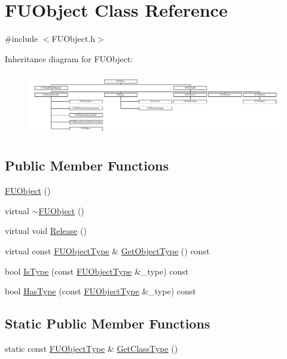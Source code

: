 \hypertarget{classFUObject}{
\section{FUObject Class Reference}
\label{classFUObject}
}


{\ttfamily \#include $<$FUObject.h$>$}

Inheritance diagram for FUObject:\begin{figure}[H]
\begin{center}
\leavevmode
\includegraphics[height=2.807017cm]{classFUObject}
\end{center}
\end{figure}
\subsection*{Public Member Functions}
\begin{DoxyCompactItemize}
\item 
\hyperlink{classFUObject_a82a14600f9f592cbdba3a0edb457ab0d}{FUObject} ()
\item 
virtual \hyperlink{classFUObject_a4dec1cc9b872769d4c3eece218278932}{$\sim$FUObject} ()
\item 
virtual void \hyperlink{classFUObject_a33be6852b877d7f29520bbe4722b846b}{Release} ()
\item 
virtual const \hyperlink{classFUObjectType}{FUObjectType} \& \hyperlink{classFUObject_af41252d8da713eae73cd7c1e9a95a9da}{GetObjectType} () const 
\item 
bool \hyperlink{classFUObject_a30e5c127c0fe7336dba6e8a15fdcde82}{IsType} (const \hyperlink{classFUObjectType}{FUObjectType} \&\_\-type) const 
\item 
bool \hyperlink{classFUObject_ab838ad4132b756dcd3614440b8e32f2a}{HasType} (const \hyperlink{classFUObjectType}{FUObjectType} \&\_\-type) const 
\end{DoxyCompactItemize}
\subsection*{Static Public Member Functions}
\begin{DoxyCompactItemize}
\item 
static const \hyperlink{classFUObjectType}{FUObjectType} \& \hyperlink{classFUObject_a907d4f6d284b3ac4f8203d557af41668}{GetClassType} ()
\end{DoxyCompactItemize}
